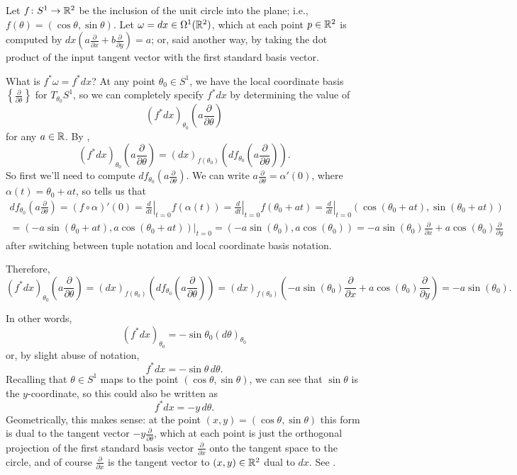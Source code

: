 \begin{example}\label{ex:unit circle pullback dx}
	Let $f \colon\thinspace\! S^1 \to \mathbb{R}^2$ be the inclusion of the unit circle into the plane; i.e., $f(\theta) = (\cos \theta , \sin \theta)$. Let $\omega = dx \in \Omega^1(\mathbb{R}^2)$, which at each point $p \in \mathbb{R}^2$ is computed by $dx\left(a \frac{\partial}{\partial x} + b \frac{\partial}{\partial y}\right) = a$; or, said another way, by taking the dot product of the input tangent vector with the first standard basis vector.
	
	What is $f^\ast \omega = f^\ast dx$? At any point $\theta_0 \in S^1$, we have the local coordinate basis $\left\{ \frac{\partial}{\partial \theta}\right\}$ for $T_{\theta_0}S^1$, so we can completely specify $f^\ast dx$ by determining the value of
	\[
		(f^\ast dx)_{\theta_0}\left( a \frac{\partial}{\partial \theta}\right)
	\]
	for any $a \in \mathbb{R}$. By ,
	\[
		(f^\ast dx)_{\theta_0}\left( a \frac{\partial}{\partial \theta}\right) = (dx)_{f(\theta_0)}\left(df_{\theta_0}\left( a \frac{\partial}{\partial \theta}\right)\right).
	\]
	So first we'll need to compute $df_{\theta_0}\left( a \frac{\partial}{\partial \theta}\right)$. We can write $a \frac{\partial}{\partial \theta} = \alpha'(0)$, where $\alpha(t) = \theta_0 + a t$, so  tells us that
	\begin{multline*}
		df_{\theta_0}\left( a \frac{\partial}{\partial \theta}\right) = (f \circ \alpha)'(0) = \left. \frac{d}{dt} \right|_{t=0} f(\alpha(t)) = \left. \frac{d}{dt} \right|_{t=0} f(\theta_0 + at) = \left. \frac{d}{dt} \right|_{t=0} (\cos(\theta_0 + at), \sin(\theta_0 + at)) \\
		= \left. (-a\sin(\theta_0 + at),a \cos(\theta_0 + at))\right|_{t=0} = (-a \sin(\theta_0), a \cos(\theta_0)) = -a \sin(\theta_0) \frac{\partial}{\partial x} + a \cos(\theta_0) \frac{\partial}{\partial y}
	\end{multline*}
	after switching between tuple notation and local coordinate basis notation. 
	
	Therefore,
	\[
		(f^\ast dx)_{\theta_0}\left( a \frac{\partial}{\partial \theta}\right) = (dx)_{f(\theta_0)}\left(df_{\theta_0}\left( a \frac{\partial}{\partial \theta}\right)\right) = (dx)_{f(\theta_0)}\left(-a \sin(\theta_0) \frac{\partial}{\partial x} + a \cos(\theta_0) \frac{\partial}{\partial y}\right) = -a \sin(\theta_0).
	\]
	
	In other words,
	\[
		(f^\ast dx)_{\theta_0} = -\sin\theta_0 (d\theta)_{\theta_0}
	\]
	or, by slight abuse of notation,
	\[
		f^\ast dx = -\sin \theta \, d\theta.
	\]
	Recalling that $\theta \in S^1$ maps to the point $(\cos \theta, \sin \theta)$, we can see that $\sin \theta$ is the $y$-coordinate, so this could also be written as
	\[
		f^\ast dx = -y \, d\theta.
	\]
	Geometrically, this makes sense: at the point $(x,y) = (\cos \theta, \sin \theta)$ this form is dual to the tangent vector $-y \frac{\partial}{\partial \theta}$, which at each point is just the orthogonal projection of the first standard basis vector $\frac{\partial}{\partial x}$ onto the tangent space to the circle, and of course $\frac{\partial}{\partial x}$ is the tangent vector to $(x,y) \in \mathbb{R}^2$ dual to $dx$. See .
	

\end{example}
